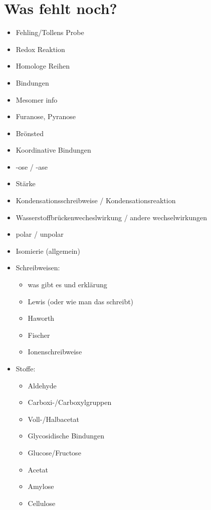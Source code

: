 
\chapter{Was fehlt noch?}
\begin{itemize}
    \item Fehling/Tollens Probe
    \item Redox Reaktion
    \item Homologe Reihen
    \item Bindungen
    \item Mesomer info
    \item Furanose, Pyranose
    \item Brönsted
    \item Koordinative Bindungen
    \item -ose / -ase
    \item Stärke
    \item Kondensationsschreibweise / Kondensationsreaktion
    \item Wasserstoffbrückenwecheslwirkung / andere wechselwirkungen
    \item polar / unpolar
    \item Isomierie (allgemein)

    \item Schreibweisen:
    \begin{itemize}
        \item was gibt es und erklärung
        \item Lewis (oder wie man das schreibt)
        \item Haworth
        \item Fischer
        \item Ionenschreibweise
    \end{itemize}

    \item Stoffe:
    \begin{itemize}
        \item Aldehyde
        \item Carboxi-/Carboxylgruppen
        \item Voll-/Halbacetat
        \item Glycosidische Bindungen
        \item Glucose/Fructose
        \item Acetat
        \item Amylose
        \item Cellulose
    \end{itemize}
\end{itemize}

